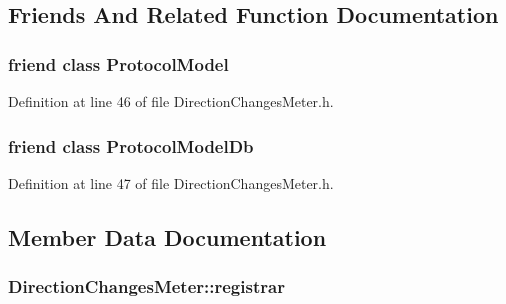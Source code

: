 \subsection{Friends And Related Function Documentation}
\hypertarget{class_vsid_1_1_direction_changes_meter_a80219b863d4ff3456933d16bc5f73f45}{
\subsubsection[{Protocol\-Model}]{\setlength{\rightskip}{0pt plus 5cm}friend class {\bf Protocol\-Model}\hspace{0.3cm}{\ttfamily [friend]}}}\label{class_vsid_1_1_direction_changes_meter_a80219b863d4ff3456933d16bc5f73f45}


Definition at line 46 of file Direction\-Changes\-Meter.\-h.

\hypertarget{class_vsid_1_1_direction_changes_meter_a3c0d389e7a9476b06313d8fb9ca9fe68}{
\subsubsection[{Protocol\-Model\-Db}]{\setlength{\rightskip}{0pt plus 5cm}friend class {\bf Protocol\-Model\-Db}\hspace{0.3cm}{\ttfamily [friend]}}}\label{class_vsid_1_1_direction_changes_meter_a3c0d389e7a9476b06313d8fb9ca9fe68}


Definition at line 47 of file Direction\-Changes\-Meter.\-h.



\subsection{Member Data Documentation}
\hypertarget{class_vsid_1_1_direction_changes_meter_a8b8e4a031632d62687f4a096c7501d5e}{
\subsubsection[{registrar}]{ Direction\-Changes\-Meter\-::registrar\hspace{0.3cm}{\ttfamily [static]}}}\label{class_vsid_1_1_direction_changes_meter_a8b8e4a031632d62687f4a096c7501d5e}


